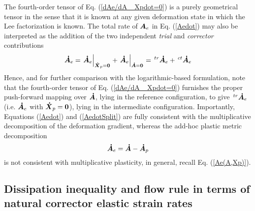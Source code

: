 \documentclass[preprint,review,12pt,sort&compress]{elsarticle}%
\newcommand{\xpdo}[0]{\scriptsize\mathbf{\dot X}_p = \mathbf{0}\normalsize\mathbf{}}
\newcommand{\ado}[0]{\scriptsize\mathbf{\dot A} = \mathbf{0}\normalsize\mathbf{}}
\renewcommand{\mathbf}[1]{\mbox{\boldmath $#1$ \unboldmath}  \!\!}
\begin{document}
The fourth-order tensor of Eq. (\ref{dAe/dA _Xpdot=0}) is a purely geometrical
tensor in the sense that it is known at any given deformation state in which
the Lee factorization is known. The total rate of $\mathbf{A}_{e}$ in Eq.
(\ref{Aedot}) may also be interpreted as the addition of the two independent
\emph{trial} and \emph{corrector} contributions%
\begin{equation}
\mathbf{\dot{A}}_{e}=\left.  \mathbf{\dot{A}}_{e}\right\vert _{%
\xpdo
}+\left.  \mathbf{\dot{A}}_{e}\right\vert _{%
\ado
}=\,^{tr}\mathbf{\dot{A}}_{e}+\,^{ct}\mathbf{\dot{A}}_{e} \label{AedotSplit}%
\end{equation}
Hence, and for further comparison with the logarithmic-based formulation, note
that the fourth-order tensor of Eq. (\ref{dAe/dA _Xpdot=0}) furnishes the
proper push-forward mapping over $\mathbf{\dot{A}}$, lying in the reference
configuration, to give $\,^{tr}\mathbf{\dot{A}}_{e}$ (i.e. $\mathbf{\dot{A}%
}_{e}$ with $\mathbf{\dot{X}}_{p}=\mathbf{0}$), lying in the intermediate
configuration. Importantly, Equations (\ref{Aedot}) and (\ref{AedotSplit}) are
fully consistent with the multiplicative decomposition of the deformation
gradient, whereas the add-hoc plastic metric decomposition%
\begin{equation}
\mathbf{\dot{A}}_{e}=\mathbf{\dot{A}}-\mathbf{\dot{A}}_{p}%
\end{equation}
is not consistent with multiplicative plasticity, in general, recall Eq.
(\ref{Ae(A,Xp)}).

\subsection{Dissipation inequality and flow rule in terms of natural corrector
elastic strain rates}
\end{document}
